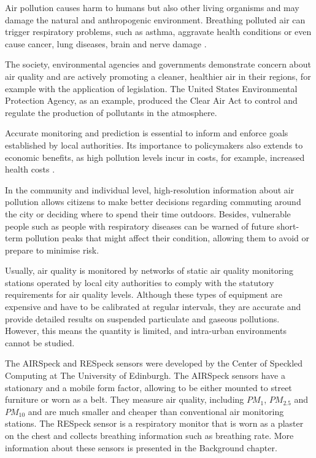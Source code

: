 Air pollution causes harm to humans but also other living organisms and may damage the natural and anthropogenic environment. Breathing polluted air can trigger respiratory problems, such as asthma, aggravate health conditions or even cause cancer, lung diseases, brain and nerve damage \cite{epa}.

The society, environmental agencies and governments demonstrate concern about air quality and are actively promoting a cleaner, healthier air in their regions, for example with the application of legislation. The United States Environmental Protection Agency, as an example, produced the Clear Air Act \cite{epa} to control and regulate the production of pollutants in the atmosphere.

Accurate monitoring and prediction is essential to inform and enforce goals established by local authorities. Its importance to policymakers also extends to economic benefits, as high pollution levels incur in costs, for example, increased health costs \cite{zoe}.

In the community and individual level, high-resolution information about air pollution allows citizens to make better decisions regarding commuting around the city or deciding where to spend their time outdoors. Besides, vulnerable people such as people with respiratory diseases can be warned of future short-term pollution peaks that might affect their condition, allowing them to avoid or prepare to minimise risk.

Usually, air quality is monitored by networks of static air quality monitoring stations operated by local city authorities to comply with the statutory requirements for air quality levels. Although these types of equipment are expensive and have to be calibrated at regular intervals, they are accurate and provide detailed results on suspended particulate and gaseous pollutions. However, this means the quantity is limited, and intra-urban environments cannot be studied. 


The AIRSpeck and RESpeck sensors were developed by the Center of Speckled Computing at The University of Edinburgh. The AIRSpeck sensors have a stationary and a mobile form factor, allowing to be either mounted to street furniture or worn as a belt. They measure air quality, including $PM_1$, $PM_{2.5}$ and $PM_{10}$ and are much smaller and cheaper than conventional air monitoring stations. The RESpeck sensor is a respiratory monitor that is worn as a plaster on the chest and collects breathing information such as breathing rate. More information about these sensors is presented in the Background chapter.

